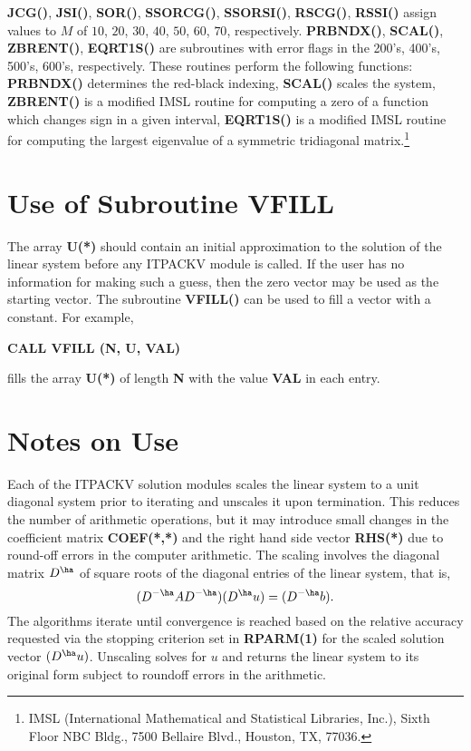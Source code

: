 \noindent
{\bf JCG()}, {\bf JSI()}, {\bf SOR()}, {\bf SSORCG()}, {\bf SSORSI()}, 
{\bf RSCG()}, {\bf RSSI()} assign values to $M$ of $10$, $20$, $30$,
$40$, $50$, $60$, $70$, 
respectively.  {\bf PRBNDX()}, {\bf SCAL()}, {\bf ZBRENT()}, {\bf EQRT1S()} 
are subroutines with error flags in the 200's, 400's, 500's, 600's, 
respectively.  These routines perform the following functions:   
{\bf PRBNDX()} determines the red-black indexing, {\bf SCAL()} scales 
the system, {\bf ZBRENT()} is a modified IMSL routine 
for computing a zero of a function which changes sign in a given 
interval, {\bf EQRT1S()} is a modified IMSL routine for computing the 
largest eigenvalue of a symmetric tridiagonal matrix.\footnote{IMSL 
(International Mathematical and Statistical Libraries, Inc.),
Sixth Floor NBC Bldg., 7500 Bellaire Blvd., Houston, TX, 77036.}
 
\section{Use of Subroutine VFILL}
\label{vfill} 

The array {\bf U(*)} should contain an initial approximation to the 
solution of the linear system before any ITPACKV module is called.  If 
the user has no information for making such a guess, then the zero vector 
may be used as the starting vector.  The subroutine {\bf VFILL()} can be 
used to fill a vector with a constant.  For example,

\bigskip
\centerline{\bf CALL VFILL (N, U, VAL)}
\bigskip

\noindent
fills the array {\bf U(*)} of length {\bf N} with the value {\bf VAL} in 
each entry.
 
\section{Notes on Use}
\label{notes}
 
Each of the ITPACKV solution modules scales the linear system to a
unit diagonal system prior to iterating and unscales it upon
termination.  This reduces the number of arithmetic operations, but it
may introduce small changes in the coefficient matrix {\bf COEF(*,*)} 
and the right hand side vector {\bf RHS(*)} due to round-off errors in 
the computer arithmetic.  The scaling involves the diagonal matrix 
$D^{\ha}$ of square roots of the diagonal entries of the linear system, 
that is,
\[  (D^{-\ha}AD^{-\ha})(D^{\ha}u) = (D^{-\ha}b). \]
The algorithms iterate until convergence is reached based on the
relative accuracy requested via the stopping criterion set in {\bf RPARM(1)}
for the scaled solution vector $(D^{\ha}u)$.  Unscaling solves for $u$ and
returns the linear system to its original form subject to roundoff
errors in the arithmetic.
 
